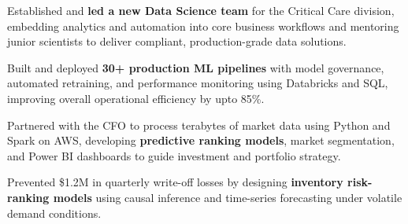 \documentclass[letterpaper,11pt]{article}
\newcommand{\resumeItem}[1]{
  \item{\small{#1}}
  \vspace{-2px}
}
\begin{document}




    \resumeItem{Established and \textbf{led a new Data Science team} for the Critical Care division, embedding analytics and automation into core business workflows and mentoring junior scientists to deliver compliant, production-grade data solutions.}


    \resumeItem{Built and deployed \textbf{30+ production ML pipelines} with model governance, automated retraining, and performance monitoring using Databricks and SQL, improving overall operational efficiency by upto 85\%.}

    \resumeItem{Partnered with the CFO to process terabytes of market data using Python and Spark on AWS, developing \textbf{predictive ranking models}, market segmentation, and Power BI dashboards to guide investment and portfolio strategy.}
    
    \resumeItem{Prevented \$1.2M in quarterly write-off losses by designing \textbf{inventory risk-ranking models} using causal inference and time-series forecasting under volatile demand conditions.}

    
    

    

    
\end{document}

